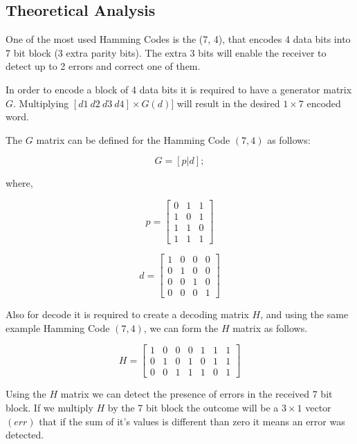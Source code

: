 \begin{refsection}
\subsection{Theoretical Analysis}

One of the most used Hamming Codes is the (7, 4), that encodes 4 data bits into 7 bit block (3 extra parity bits). The extra 3 bits will enable the receiver to detect up to 2 errors and correct one of them.

In order to encode a block of 4 data bits it is required to have a generator matrix $G$. Multiplying $[d1 ~ d2 ~ d3 ~ d4] \times G(d)]$ will result in the desired $1 \times 7$ encoded word.

The $G$ matrix can be defined for the Hamming Code $(7, 4)$ as follows:

\begin{equation}
G = [p | d];
\end{equation}

where,

\begin{equation}
	p = \begin{bmatrix}
	0 & 1 & 1 \\
	1 & 0 & 1 \\
	1 & 1 & 0 \\
	1 & 1 & 1
	\end{bmatrix}
\end{equation}

\begin{equation}
	d = \begin{bmatrix}
	1 & 0 & 0 & 0 \\
	0 & 1 & 0 & 0 \\
	0 & 0 & 1 & 0 \\
	0 & 0 & 0 & 1
	\end{bmatrix}
\end{equation}

Also for decode it is required to create a decoding matrix $H$, and using the same example Hamming Code $(7, 4)$, we can form the $H$ matrix as follows.

\begin{equation}
H = \begin{bmatrix}
1 & 0 & 0 & 0 & 1 & 1 & 1 \\
0 & 1 & 0 & 1 & 0 & 1 & 1 \\
0 & 0 & 1 & 1 & 1 & 0 & 1
\end{bmatrix}
\end{equation}

Using the $H$ matrix we can detect the presence of errors in the received 7 bit block. If we multiply $H$ by the 7 bit block the outcome will be a $3 \times 1$ vector $(err)$ that if the sum of it's values is different than zero it means an error was detected.


\end{refsection}
